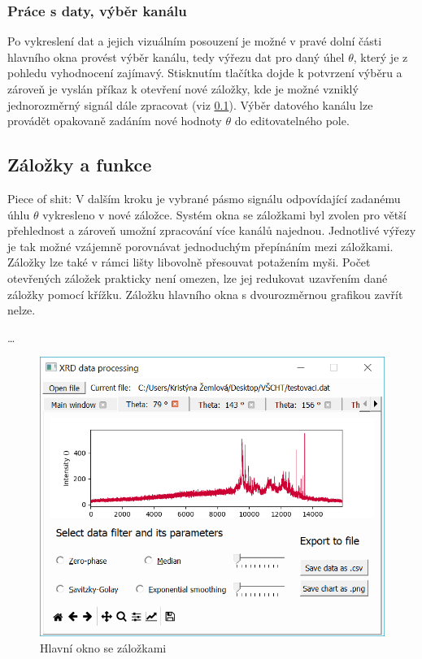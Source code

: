\documentclass[a4paper, 12pt]{article}
\begin{document}
\subsubsection{Práce s daty, výběr kanálu} \label{sec:channel}
Po vykreslení dat a jejich vizuálním posouzení je možné v pravé dolní části hlavního okna provést výběr kanálu, tedy výřezu dat pro daný úhel $\theta$, který je z pohledu vyhodnocení zajímavý. Stisknutím tlačítka  dojde k potvrzení výběru a zároveň je vyslán příkaz k otevření nové záložky, kde je možné vzniklý jednorozměrný signál dále zpracovat (viz \ref{sec:fcntabs}). Výběr datového kanálu lze provádět opakovaně zadáním nové hodnoty $\theta$ do editovatelného pole.

\subsection{Záložky a funkce} \label{sec:fcntabs}
Piece of shit: \textcolor{cdorange}{V dalším kroku je vybrané pásmo signálu odpovídající zadanému úhlu $\theta$ vykresleno v nové záložce. Systém okna se záložkami byl zvolen pro větší přehlednost a zároveň umožní zpracování více kanálů najednou. Jednotlivé výřezy je tak možné vzájemně porovnávat jednoduchým přepínáním mezi záložkami. Záložky lze také v rámci lišty libovolně přesouvat potažením myši. Počet otevřených záložek prakticky není omezen, lze jej redukovat uzavřením dané záložky pomocí křížku. Záložku hlavního okna s dvourozměrnou grafikou zavřít nelze.}

\ldots

\begin{figure}[hbt!]
    \centering
    \includegraphics[width=\linewidth]{gui_tab.png}
    \caption{Hlavní okno se záložkami}
    \label{fig:gui_tab}
\end{figure}
\end{document}
